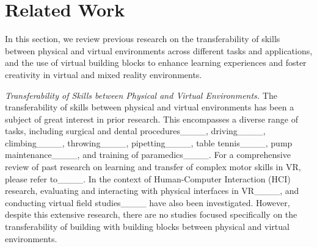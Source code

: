 \section{Related Work}
In this section, we review previous research on the transferability of skills between physical and virtual environments across different tasks and applications, and the use of virtual building blocks to enhance learning experiences and foster creativity in virtual and mixed reality environments.

\textit{Transferability of Skills between Physical and Virtual Environments.}
The transferability of skills between physical and virtual environments has been a subject of great interest in prior research. 
This encompasses a diverse range of tasks, including surgical and dental procedures____, driving____, climbing____, throwing____, pipetting____, table tennis____, pump maintenance____, and training of paramedics____.
For a comprehensive review of past research on learning and transfer of complex motor skills in VR, please refer to____.
In the context of Human-Computer Interaction (HCI) research, evaluating and interacting with physical interfaces in VR____, and conducting virtual field studies____ have also been investigated. 
However, despite this extensive research, there are no studies focused specifically on the transferability of building with building blocks between physical and virtual environments.

